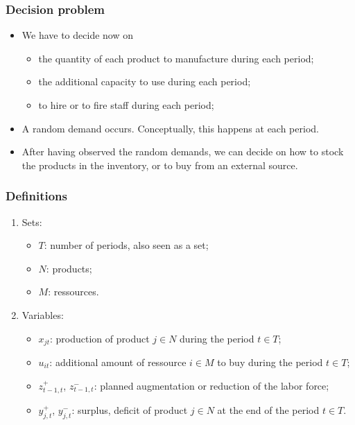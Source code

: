 \documentclass{beamer}
\begin{document}
\begin{frame}
\frametitle{Decision problem}

\begin{itemize}
\item
We have to decide now on
\begin{itemize}
\item
the quantity of each product to manufacture during each period;
\item
the additional capacity to use during each period;
\item
to hire or to fire staff during each period;
\end{itemize}
\item
A random demand occurs. Conceptually, this happens at each period.
\item
After having observed the random demands, we can decide on how to stock the products in the inventory, or to buy from an external source.
\end{itemize}

\end{frame}

\begin{frame}
\frametitle{Definitions}

\begin{enumerate}
\item
{\red Sets}:
\begin{itemize}
\item
$T$: number of periods, also seen as a set;
\item
$N$: products;
\item
$M$: ressources.
\end{itemize}
\item
{\red Variables}:
\begin{itemize}
\item
$x_{jt}$: production of product $j \in N$ during the period $t \in T$;
\item
$u_{it}$: additional amount of ressource $i \in M$ to buy during the period  $t \in T$;
\item
$z_{t-1,t}^+$, $z_{t-1,t}^-$: planned augmentation or reduction of the labor force;
\item
$y_{j,t}^+$, $y_{j,t}^-$: surplus, deficit of product $j \in N$ at the end of the period $t \in T$.
\end{itemize}
\end{enumerate}

\end{frame}
\end{document}
